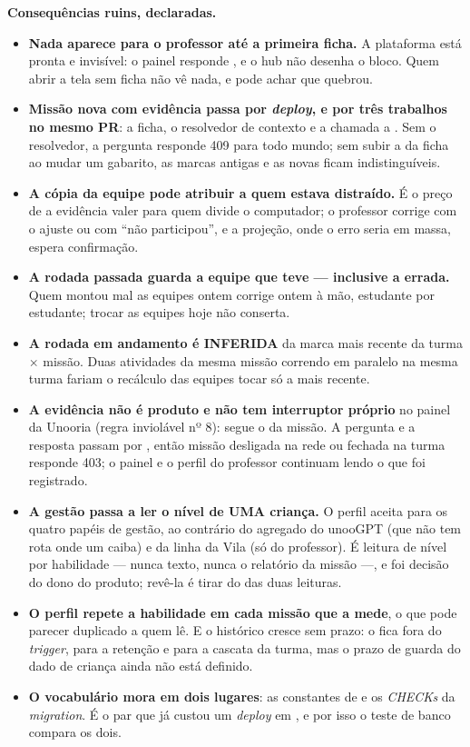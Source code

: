 \textbf{Consequências ruins, declaradas.}

\begin{itemize}
  \item \textbf{Nada aparece para o professor até a primeira ficha.} A
    plataforma está pronta e invisível: o painel responde
    , e o hub não desenha o bloco. Quem abrir a tela sem
    ficha não vê nada, e pode achar que quebrou.
  \item \textbf{Missão nova com evidência passa por \emph{deploy}, e por três
    trabalhos no mesmo PR}: a ficha, o resolvedor de contexto e a chamada a
    . Sem o resolvedor, a pergunta responde 409
     para todo mundo; sem subir a  da
    ficha ao mudar um gabarito, as marcas antigas e as novas ficam
    indistinguíveis.
  \item \textbf{A cópia da equipe pode atribuir a quem estava distraído.} É o
    preço de a evidência valer para quem divide o computador; o professor
    corrige com o ajuste ou com \enquote{não participou}, e a projeção, onde o
    erro seria em massa, espera confirmação.
  \item \textbf{A rodada passada guarda a equipe que teve --- inclusive a
    errada.} Quem montou mal as equipes ontem corrige ontem à mão, estudante por
    estudante; trocar as equipes hoje não conserta.
  \item \textbf{A rodada em andamento é INFERIDA} da marca mais recente da
    turma $\times$ missão. Duas atividades da mesma missão correndo em paralelo
    na mesma turma fariam o recálculo das equipes tocar só a mais recente.
  \item \textbf{A evidência não é produto e não tem interruptor próprio} no
    painel da Unooria (regra inviolável nº 8): segue o da missão. A pergunta e a
    resposta passam por , então missão desligada na
    rede ou fechada na turma responde 403; o painel e o perfil do professor
    continuam lendo o que foi registrado.
  \item \textbf{A gestão passa a ler o nível de UMA criança.} O perfil aceita
     para os quatro papéis de gestão, ao contrário do agregado
    do unooGPT (que não tem rota onde um  caiba) e da linha da
    Vila (só do professor). É leitura de nível por habilidade --- nunca texto,
    nunca o relatório da missão ---, e foi decisão do dono do produto; revê-la
    é tirar  do  das duas leituras.
  \item \textbf{O perfil repete a habilidade em cada missão que a mede}, o que
    pode parecer duplicado a quem lê. E o histórico cresce sem prazo: o
     fica fora do \emph{trigger}, para a retenção e para a cascata da
    turma, mas o prazo de guarda do dado de criança ainda não está definido.
  \item \textbf{O vocabulário mora em dois lugares}: as constantes de
     e os \emph{CHECKs} da \emph{migration}. É o par
    que já custou um \emph{deploy} em , e por isso o teste de
    banco compara os dois.
\end{itemize}

